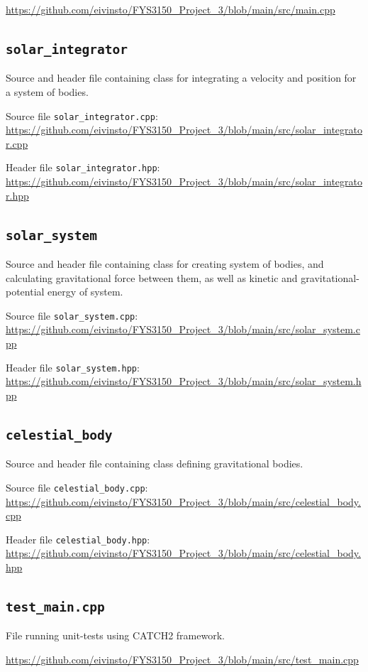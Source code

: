 \documentclass[reprint,english,notitlepage]{revtex4-1}  %
\begin{document}
\url{https://github.com/eivinsto/FYS3150_Project_3/blob/main/src/main.cpp}

\cprotect\subsection{\verb+solar_integrator+} \label{A.3}
Source and header file containing class for integrating a velocity and position for a system of bodies.

Source file \verb+solar_integrator.cpp+:
\url{https://github.com/eivinsto/FYS3150_Project_3/blob/main/src/solar_integrator.cpp}

Header file \verb+solar_integrator.hpp+:
\url{https://github.com/eivinsto/FYS3150_Project_3/blob/main/src/solar_integrator.hpp}

\cprotect\subsection{\verb+solar_system+} \label{A.4}
Source and header file containing class for creating system of bodies, and calculating gravitational force between them, as well as kinetic and gravitational-potential energy of system.

Source file \verb+solar_system.cpp+:
\url{https://github.com/eivinsto/FYS3150_Project_3/blob/main/src/solar_system.cpp}

Header file \verb+solar_system.hpp+:
\url{https://github.com/eivinsto/FYS3150_Project_3/blob/main/src/solar_system.hpp}

\cprotect\subsection{\verb+celestial_body+} \label{A.5}
Source and header file containing class defining gravitational bodies.

Source file \verb+celestial_body.cpp+:
\url{https://github.com/eivinsto/FYS3150_Project_3/blob/main/src/celestial_body.cpp}

Header file \verb+celestial_body.hpp+:
\url{https://github.com/eivinsto/FYS3150_Project_3/blob/main/src/celestial_body.hpp}

\cprotect\subsection{\verb+test_main.cpp+} \label{A.6}
File running unit-tests using CATCH2 framework.

\url{https://github.com/eivinsto/FYS3150_Project_3/blob/main/src/test_main.cpp}
\end{document}
